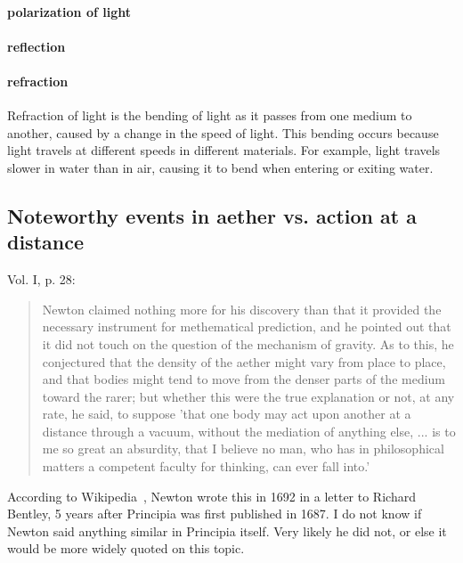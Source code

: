 \documentclass[a4paper]{article}
\theoremstyle{plain}
\theoremstyle{definition}
\begin{document}
\paragraph{polarization of light}

\paragraph{reflection}

\paragraph{refraction}

Refraction of light is the bending of light as it passes from one
medium to another, caused by a change in the speed of light.  This
bending occurs because light travels at different speeds in different
materials. For example, light travels slower in water than in air,
causing it to bend when entering or exiting water.


\subsection{Noteworthy events in aether vs. action at a distance}

Vol. I, p. 28:

\begin{quote}
  Newton claimed nothing more for his discovery than that it provided
  the necessary instrument for methematical prediction, and he pointed out
  that it did not touch on the question of the mechanism of gravity.
  As to this, he conjectured that the density of the aether might vary from
  place to place, and that bodies might tend to move from the denser parts
  of the medium toward the rarer; but whether this were the true explanation
  or not, at any rate, he said, to suppose 'that one body may act upon
  another at a distance through a vacuum, without the mediation of anything
  else, ... is to me so great an absurdity, that I believe no man, who has
  in philosophical matters a competent faculty for thinking, can ever fall
  into.'
\end{quote}

According to Wikipedia~\cite{WikipediaNewtonLawOfGravity}, Newton
wrote this in 1692 in a letter to Richard Bentley, 5 years after
Principia was first published in 1687.  I do not know if Newton said
anything similar in Principia itself.  Very likely he did not, or else
it would be more widely quoted on this topic.
\end{document}
